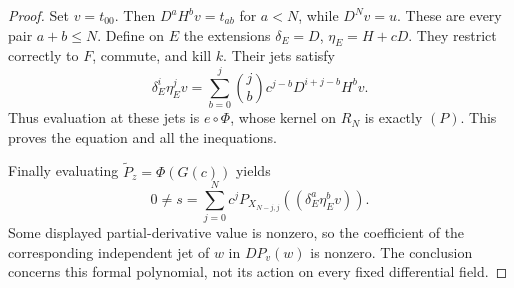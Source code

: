 \documentclass{article}
\begin{document}
\begin{proof}
Set $v=t_{00}$. Then $D^aH^bv=t_{ab}$ for $a<N$, while $D^Nv=u$. These are every pair $a+b\leq N$. Define on $E$ the extensions $\delta_E=D$, $\eta_E=H+cD$. They restrict correctly to $F$, commute, and kill $k$. Their jets satisfy
\[
 \delta_E^i\eta_E^jv=\sum_{b=0}^j\binom jb c^{j-b}D^{i+j-b}H^bv.
\]
Thus evaluation at these jets is $e\circ\Phi$, whose kernel on $R_N$ is exactly $(P)$. This proves the equation and all the inequations.

Finally evaluating $\widetilde P_z=\Phi(G(c))$ yields
\[
 0\ne s=\sum_{j=0}^N c^jP_{X_{N-j,j}}((\delta_E^a\eta_E^bv)).
\]
Some displayed partial-derivative value is nonzero, so the coefficient of the corresponding independent jet of $w$ in $DP_v(w)$ is nonzero. The conclusion concerns this formal polynomial, not its action on every fixed differential field.
\end{proof}
\end{document}
